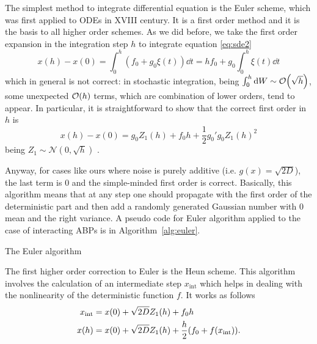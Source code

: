 \documentclass[../../master_thesis_np.tex]{subfiles}
\begin{document}
		The simplest method to integrate differential equation is the Euler scheme, which was first applied to ODEs in XVIII century. 
		It is a first order method and it is the basis to all higher order schemes. 
		As we did before, we take the first order expansion in the integration step $h$ to integrate equation \ref{eq:sde2}
		\begin{equation}
		x(h) - x(0) = \int_0^h (f_0 + g_0 \xi(t)) \dd{t} = h f_0 + g_0 \int_0^h \xi(t) \dd{t}
		\end{equation}
		which in general is not correct: in stochastic integration, being $\int_{0}^{h} \dd{W} \sim \order{\sqrt{h}}$, some unexpected $\order{h}$ terms, which are combination of lower orders, tend to appear. 
		In particular, it is straightforward to show that the correct first order in $h$ is 
		\begin{equation}
		x(h) - x(0) = g_0 Z_1(h) + f_0 h + \frac{1}{2} g_0' g_0 Z_1(h)^2
		\end{equation}
		being $Z_1\sim \mathcal{N}(0,\sqrt{h})$ \cite{mannella_integration_2011}. 
		
		Anyway, for cases like ours where noise is purely additive (i.e. $g(x) = \sqrt{2D}$), the last term is $0$ and the simple-minded first order is correct. 
		Basically, this algorithm means that at any step one should propagate with the first order of the deterministic part and then add a randomly generated Gaussian number with 0 mean and the right variance. 
		A pseudo code for Euler algorithm applied to the case of interacting ABPs is in Algorithm~\ref{alg:euler}.
		
		\begin{algorithm}
			\caption{The Euler algorithm} \label{alg:euler}	
			\begin{algorithmic}[1]
				\EndFor
				\EndFor
			\end{algorithmic}
		\end{algorithm}
		
		The first higher order correction to Euler is the Heun scheme. 
		This algorithm involves the calculation of an intermediate step $x_{\text{int}}$ which helps in dealing with the nonlinearity of the deterministic function $f$. It works as follows
		\begin{equation}
			\begin{aligned}
				x_{\text{int}} &= x(0) + \sqrt{2D} Z_1(h) + f_0 h\\
				x(h) &= x(0) + \sqrt{2D} Z_1(h) + \frac{h}{2} \qty(f_0 + f(x_{\text{int}})).
			\end{aligned}
		\end{equation}
		
\end{document}
